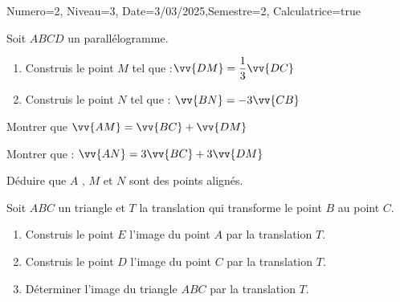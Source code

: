 \documentclass[a4paper,12pt]{article}
\begin{document}
\begin{Maquette}[DS]{Numero=2, Niveau=3, Date=3/03/2025,Semestre=2, Calculatrice=true}
\begin{exercice}
\begin{minipage}[b]{.6\linewidth}
Soit $ABCD$ un parallélogramme.
\begin{enumerate}
\item{} Construis le point $M$ tel que :$\vv{DM}=\dfrac{1}{3}\vv{DC}$
\item{} Construis le point $N$ tel que : $\vv{BN}=-3\vv{CB}$
\end{enumerate}
\end{minipage}%
\begin{minipage}[b]{.4\linewidth}
\end{minipage}
\begin{enumerate}[start=3]
\begin{minipage}{.48\linewidth}
\item Montrer que $\vv{AM}=\vv{BC}+\vv{DM}$\newline
\anserline[5]
\end{minipage}\hfill\vrule\hfill%
\begin{minipage}{.48\linewidth}
\item{} Montrer que : $\vv{AN}=3\vv{BC}+3\vv{DM}$\newline
\anserline[5]
\end{minipage}
\item{} Déduire que $A$ , $M$ et $N$ sont des points alignés.
\newline\anserline[5]
\end{enumerate}
\end{exercice}

\begin{exercice}
Soit $ABC$ un triangle et $T$ la translation qui transforme le point $B$ au point $C$.
\begin{enumerate}
\item{} Construis le point $E$ l'image du point $A$ par la translation $T$.
\item{} Construis le point $D$ l'image du point $C$ par la translation $T$.
\item{} Déterminer l'image du triangle $ABC$ par la translation $T$.
\end{enumerate}
\end{exercice}


\end{Maquette}
\end{document}
